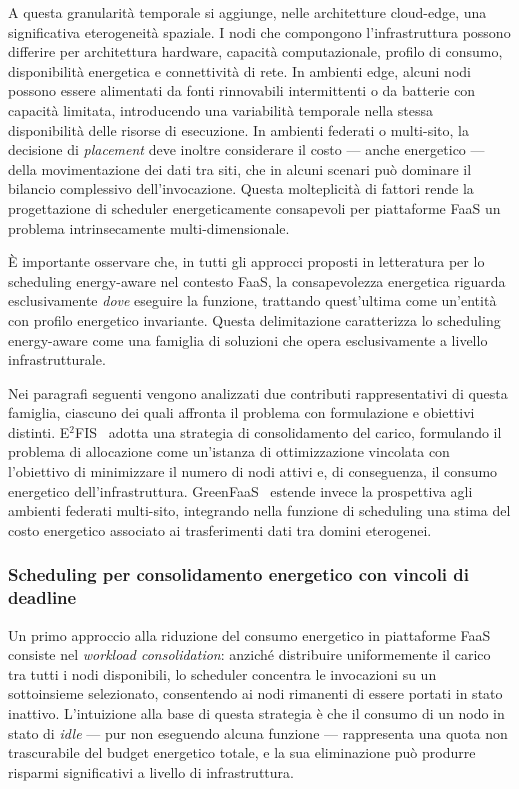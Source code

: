 A questa granularità temporale si aggiunge, 
nelle architetture cloud-edge, una significativa eterogeneità 
spaziale. 
I nodi che compongono l'infrastruttura possono differire per architettura 
hardware, capacità computazionale, profilo di consumo, disponibilità 
energetica e connettività di rete. In ambienti edge, alcuni nodi possono essere alimentati da fonti rinnovabili intermittenti o da batterie con capacità limitata, 
introducendo una variabilità temporale nella stessa disponibilità delle risorse di esecuzione. In ambienti federati o multi-sito, la decisione di \emph{placement} 
deve inoltre considerare il costo --- anche energetico --- della movimentazione dei dati tra siti, che in alcuni scenari può dominare il bilancio complessivo dell'invocazione.
 Questa molteplicità di fattori rende la progettazione di scheduler energeticamente consapevoli per piattaforme FaaS un problema intrinsecamente multi-dimensionale.

È importante osservare che, in tutti gli approcci proposti in letteratura per lo scheduling energy-aware nel contesto FaaS, la consapevolezza energetica 
riguarda esclusivamente \emph{dove} eseguire la funzione, trattando quest'ultima come un'entità con profilo energetico invariante. 
Questa delimitazione caratterizza lo scheduling energy-aware come una famiglia di soluzioni che opera esclusivamente a livello infrastrutturale.

Nei paragrafi seguenti vengono analizzati due contributi rappresentativi di questa famiglia, ciascuno dei quali affronta 
il problema con formulazione e obiettivi distinti. E$^{2}$FIS~\cite{e2fis_smartcomp} adotta una strategia di consolidamento del carico, 
formulando il problema di allocazione come un'istanza di ottimizzazione vincolata con l'obiettivo di minimizzare il numero di nodi attivi e, di conseguenza, 
il consumo energetico dell'infrastruttura. GreenFaaS~\cite{greenfaas} estende invece la prospettiva agli ambienti federati multi-sito, integrando nella 
funzione di scheduling una stima del costo energetico associato ai trasferimenti dati tra domini eterogenei.
\subsubsection{Scheduling per consolidamento energetico con vincoli di deadline}
\label{subsubsec:e2fis_consolidation}

Un primo approccio alla riduzione del consumo energetico in piattaforme
FaaS consiste nel \emph{workload consolidation}: anziché distribuire
uniformemente il carico tra tutti i nodi disponibili, lo scheduler
concentra le invocazioni su un sottoinsieme selezionato, consentendo ai
nodi rimanenti di essere portati in stato inattivo. L'intuizione alla
base di questa strategia è che il consumo di un nodo in stato di
\emph{idle} --- pur non eseguendo alcuna funzione --- rappresenta una
quota non trascurabile del budget energetico totale, e la sua
eliminazione può produrre risparmi significativi a livello di
infrastruttura.

